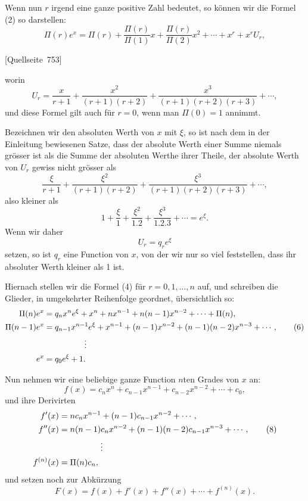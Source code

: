 \documentclass[11pt]{article}
\newcommand{\srcpage}[1]{\par\medskip\noindent\textsf{[Quellseite~#1]}\par\smallskip}
\begin{document}
Wenn nun $r$ irgend eine ganze positive Zahl bedeutet, so können wir die Formel (2) so darstellen:
\begin{equation}\tag{4}
\Pi(r)e^x=\Pi(r)+\frac{\Pi(r)}{\Pi(1)}x+\frac{\Pi(r)}{\Pi(2)}x^2+\cdots+x^r+x^rU_r,
\end{equation}
\srcpage{753}
worin
\begin{equation}\tag{5}
U_r=\frac{x}{r+1}+\frac{x^2}{(r+1)(r+2)}+\frac{x^3}{(r+1)(r+2)(r+3)}+\cdots,
\end{equation}
und diese Formel gilt auch für $r=0$, wenn man $\Pi(0)=1$ annimmt.

Bezeichnen wir den absoluten Werth von $x$ mit $\xi$, so ist nach dem in der Einleitung bewiesenen Satze, dass der absolute Werth einer Summe niemals grösser ist als die Summe der absoluten Werthe ihrer Theile, der absolute Werth von $U_r$ gewiss nicht grösser als
\[
\frac{\xi}{r+1}
+\frac{\xi^2}{(r+1)(r+2)}
+\frac{\xi^3}{(r+1)(r+2)(r+3)}
+\cdots,
\]
also kleiner als
\[
1+\frac{\xi}{1}+\frac{\xi^2}{1.2}+\frac{\xi^3}{1.2.3}+\cdots=e^\xi.
\]
Wenn wir daher
\[
U_r=q_r e^\xi
\]
setzen, so ist $q_r$ eine Function von $x$, von der wir nur so viel feststellen, dass ihr absoluter Werth kleiner als 1 ist.

Hiernach stellen wir die Formel (4) für $r=0,1,\ldots,n$ auf, und schreiben die Glieder, in umgekehrter Reihenfolge geordnet, übersichtlich so:
\begin{align}
\Pi(n)e^x&=q_nx^n e^\xi+x^n+nx^{n-1}+n(n-1)x^{n-2}+\cdots+\Pi(n),\notag\\
\Pi(n-1)e^x&=q_{n-1}x^{n-1}e^\xi+x^{n-1}+(n-1)x^{n-2}
 +(n-1)(n-2)x^{n-3}+\cdots,\tag{6}\\
&\hspace{5em}\vdots\notag\\
e^x&=q_0e^\xi+1.\notag
\end{align}

Nun nehmen wir eine beliebige ganze Function $n$ten Grades von $x$ an:
\begin{equation}\tag{7}
f(x)=c_nx^n+c_{n-1}x^{n-1}+c_{n-2}x^{n-2}+\cdots+c_0,
\end{equation}
und ihre Derivirten
\begin{align}
f'(x)&=nc_nx^{n-1}+(n-1)c_{n-1}x^{n-2}+\cdots,\\
f''(x)&=n(n-1)c_nx^{n-2}+(n-1)(n-2)c_{n-1}x^{n-3}+\cdots,\tag{8}\\
&\hspace{5em}\vdots\notag\\
f^{(n)}(x)&=\Pi(n)c_n,\notag
\end{align}
und setzen noch zur Abkürzung
\begin{equation}\tag{9}
F(x)=f(x)+f'(x)+f''(x)+\cdots+f^{(n)}(x).
\end{equation}
\end{document}
